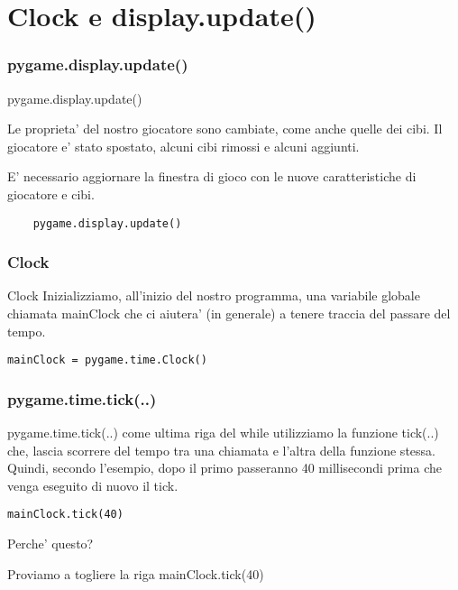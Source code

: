 \documentclass{beamer}
\begin{document}
\section{Clock e display.update()}

\begin{frame}[fragile]
\frametitle{pygame.display.update()}

\begin{block}{pygame.display.update()}

Le proprieta' del nostro giocatore sono cambiate, come anche quelle dei cibi. Il giocatore e' stato spostato, alcuni cibi rimossi e alcuni aggiunti.

E' necessario aggiornare la finestra di gioco con le nuove caratteristiche di giocatore e cibi.
\end{block}

\begin{lstlisting}
    pygame.display.update()
\end{lstlisting}

\end{frame}

\begin{frame}[fragile]
\frametitle{Clock}

\begin{block}{Clock}
Inizializziamo, all'inizio del nostro programma, una variabile globale chiamata mainClock che ci aiutera' (in generale) a tenere traccia del passare del tempo.
\end{block}

\begin{lstlisting}
mainClock = pygame.time.Clock()
\end{lstlisting}
\end{frame}

\begin{frame}[fragile]
\frametitle{pygame.time.tick(..)}

\begin{block}{pygame.time.tick(..)}
come ultima riga del while utilizziamo la funzione tick(..) che, lascia scorrere del tempo tra una chiamata e l'altra della funzione stessa. Quindi, secondo l'esempio, dopo il primo passeranno 40 millisecondi prima che venga eseguito di nuovo il tick.
\end{block}

\begin{lstlisting}
mainClock.tick(40)
\end{lstlisting}

\begin{block}{}
Perche' questo?

Proviamo a togliere la riga mainClock.tick(40)
\end{block}

\end{frame}
\end{document}

